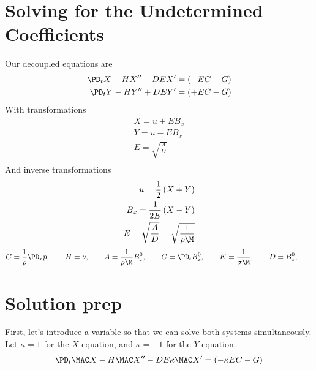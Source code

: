 \documentclass[11pt]{article}
\begin{document}
\doublespacing
\MOONSTITLE
\maketitle

\section{Solving for the Undetermined Coefficients}
Our decoupled equations are
\begin{equation}\begin{aligned}
\PD_t X - H X'' - DE X'  = (- EC -G)\\
\PD_t Y - H Y'' + DE Y'  = (+ EC -G)\\
\end{aligned} \end{equation}
With transformations
\begin{equation}\begin{aligned}
X = u + E B_x \\
Y = u - E B_x \\
E = \sqrt{\frac{A}{D}} \\
\end{aligned} \end{equation}
And inverse transformations
\begin{equation}\begin{aligned}
u   = \frac{1}{2} \left( X + Y \right) \\
B_x = \frac{1}{2E} \left( X - Y \right) \\
E = \sqrt{\frac{A}{D}} = \sqrt{\frac{1}{\rho \M}} \\
\end{aligned} \end{equation}
\begin{equation}\begin{aligned}
G = \frac{1}{\rho}\PD_x p, \qquad
H = \nu, \qquad
A = \frac{1}{\rho \M} B_z^0, \qquad
C = \PD_t B_x^0, \qquad
K = \frac{1}{\sigma \M}, \qquad
D = B_z^0, \qquad
\end{aligned} \end{equation}

\section{Solution prep}
First, let's introduce a variable so that we can solve both systems simultaneously. Let $\kappa = 1$ for the $X$ equation, and $\kappa = -1$ for the $Y$ equation.
\begin{equation}\begin{aligned}
	\PD_t \MAC X - H \MAC X'' - DE \kappa \MAC X'  = (- \kappa EC -G) \\
\end{aligned} \end{equation}
\end{document}
